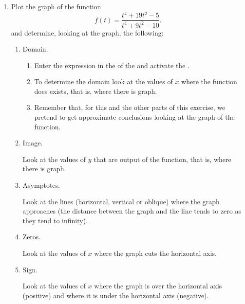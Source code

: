 \begin{enumerate}[leftmargin=*]
\item Plot the graph of the function
      \[
      f(t)=\frac{t^{4} +19t^{2} - 5}{t^{4} +9t^{2} - 10}.
      \]
      and determine, looking at the graph, the following:

      \begin{enumerate}
      \item Domain.
            \begin{indication}
            \begin{enumerate}
            \item Enter the expression  in the  of the  and activate the .
            \item To determine the domain look at the values of $x$ where the function does exists, that is, where there is graph.
            \item Remember that, for this and the other parts of this exercise, we pretend to get approximate conclusions looking at the graph of the function.
            \end{enumerate}
            \end{indication}

      \item Image.
            \begin{indication}
            Look at the values of $y$ that are output of the function, that is, where there is graph.
            \end{indication}

      \item Asymptotes.
            \begin{indication}
            Look at the lines (horizontal, vertical or oblique) where the graph approaches (the distance between the graph and the line tends to zero as they tend to infinity).
            \end{indication}

      \item Zeros.
            \begin{indication}
            Look at the values of $x$ where the graph cuts the horizontal axis.
            \end{indication}

      \item Sign.
            \begin{indication}
            Look at the values of $x$ where the graph is over the horizontal axis (positive) and where it is under the horizontal axis (negative).
            \end{indication}


\end{enumerate}
\end{enumerate}

